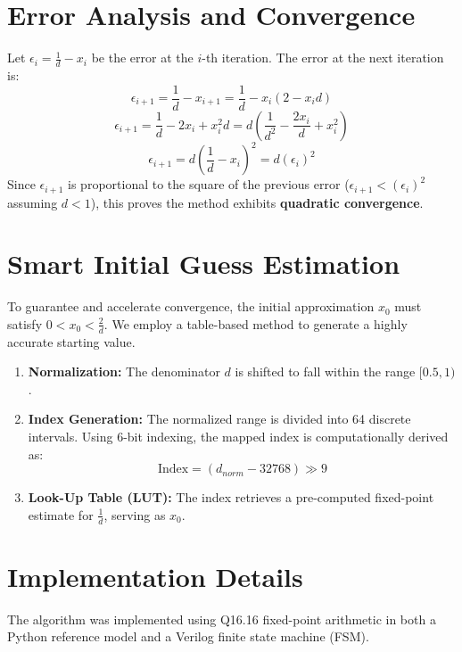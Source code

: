 \documentclass[12pt,a4paper]{article}
\begin{document}
\section{Error Analysis and Convergence}
Let $\epsilon_i = \frac{1}{d} - x_i$ be the error at the $i$-th iteration. The error at the next iteration is:
\begin{equation}
    \epsilon_{i+1} = \frac{1}{d} - x_{i+1} = \frac{1}{d} - x_i(2 - x_i d)
\end{equation}
\begin{equation}
    \epsilon_{i+1} = \frac{1}{d} - 2x_i + x_i^2 d = d\left(\frac{1}{d^2} - \frac{2x_i}{d} + x_i^2\right)
\end{equation}
\begin{equation}
    \epsilon_{i+1} = d\left(\frac{1}{d} - x_i\right)^2 = d(\epsilon_i)^2
\end{equation}
Since $\epsilon_{i+1}$ is proportional to the square of the previous error ($\epsilon_{i+1} < (\epsilon_i)^2$ assuming $d < 1$), this proves the method exhibits \textbf{quadratic convergence}.

\section{Smart Initial Guess Estimation}
To guarantee and accelerate convergence, the initial approximation $x_0$ must satisfy $0 < x_0 < \frac{2}{d}$. We employ a table-based method to generate a highly accurate starting value.

\begin{enumerate}
    \item \textbf{Normalization:} The denominator $d$ is shifted to fall within the range $[0.5, 1)$. 
    \item \textbf{Index Generation:} The normalized range is divided into 64 discrete intervals. Using 6-bit indexing, the mapped index is computationally derived as:
    \begin{equation}
        \text{Index} = (d_{norm} - 32768) \gg 9
    \end{equation}
    \item \textbf{Look-Up Table (LUT):} The index retrieves a pre-computed fixed-point estimate for $\frac{1}{d}$, serving as $x_0$.
\end{enumerate}

\section{Implementation Details}
The algorithm was implemented using Q16.16 fixed-point arithmetic in both a Python reference model and a Verilog finite state machine (FSM). 
\end{document}

